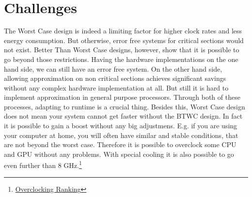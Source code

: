 \documentclass[12pt, a4paper]{article}
\begin{document}
	\section{Challenges}
	The Worst Case design is indeed a limiting factor for higher clock rates and less energy consumption. But otherwise, error free systems for critical sections would not exist. Better Than Worst Case designs, however, show that it is possible to go beyond those restrictions. Having the hardware implementations on the one hand side, we can still have an error free system. On the other hand side, allowing approximation on non critical sections achieves significant savings without any complex hardware implementation at all. But still it is hard to implement approximation in general purpose processors. Through both of these processes, adapting to runtime is a crucial thing.
	Besides this, Worst Case design does not mean your system cannot get faster without the BTWC design. In fact it is possible to gain a boost without any big adjustmens. E.g. if you are using your computer at home, you will often have similar and stable conditions, that are not beyond the worst case. Therefore it is possible to overclock some CPU and GPU without any problems. With special cooling it is also possible to go even further than 8 GHz.\footnote{\href{http://valid.canardpc.com/records.php}{Overclocking Ranking}}

	
	
\end{document}
